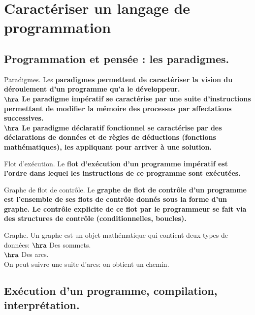 \documentclass[french, 11pt]{article}
\begin{document}


\section{Caractériser un langage de programmation}

\subsection{Programmation et pensée : les paradigmes.}

\begin{defi}{Paradigmes.}{}
    Les \bf{paradigmes} permettent de caractériser la vision du déroulement d'un programme qu'a le développeur.\\
    $\hra$ Le paradigme impératif se caractérise par une suite d'instructions permettant de modifier la mémoire des processus par affectations successives.\\
    $\hra$ Le paradigme déclaratif fonctionnel se caractérise par des déclarations de données et de règles de déductions (fonctions mathématiques), les appliquant pour arriver à une solution.
\end{defi}

\begin{defi}{Flot d'exécution.}{}
    Le \bf{flot d'exécution} d'un programme impératif est l'ordre dans lequel les instructions de ce programme sont exécutées. 
\end{defi}

\begin{defi}{Graphe de flot de contrôle.}{}
    Le \bf{graphe de flot de contrôle} d'un programme est l'ensemble de ses flots de contrôle donnés sous la forme d'un graphe.\n
    Le contrôle explicite de ce flot par le programmeur se fait via des structures de contrôle (conditionnelles, boucles).
\end{defi}

\begin{defi}{Graphe.}{}
    Un graphe est un objet mathématique qui contient deux types de données:
    $\hra$ Des sommets.\\
    $\hra$ Des arcs.\\
    On peut suivre une suite d'arcs: on obtient un chemin.
\end{defi}

\subsection{Exécution d'un programme, compilation, interprétation.}
\end{document}
